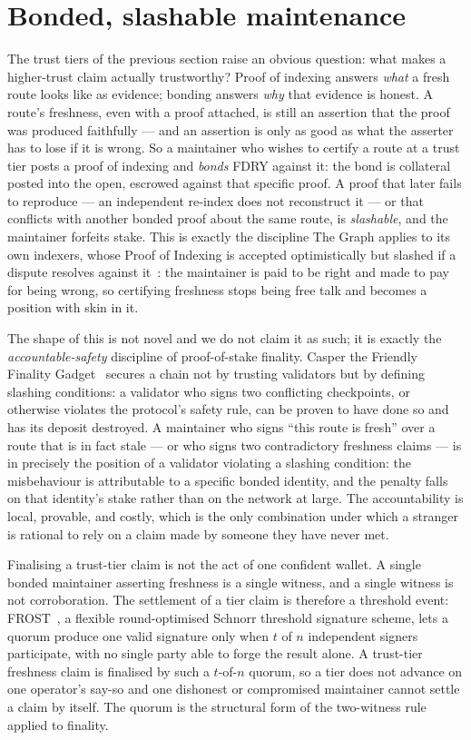 \documentclass[11pt]{article}
\begin{document}
\section{Bonded, slashable maintenance}

The trust tiers of the previous section raise an obvious question: what makes a
higher-trust claim actually trustworthy? Proof of indexing answers \emph{what} a
fresh route looks like as evidence; bonding answers \emph{why} that evidence is
honest. A route's freshness, even with a proof attached, is still an assertion that
the proof was produced faithfully --- and an assertion is only as good as what the
asserter has to lose if it is wrong. So a maintainer who wishes to certify a route
at a trust tier posts a proof of indexing and \emph{bonds} FDRY against it: the bond
is collateral posted into the open, escrowed against that specific proof. A proof
that later fails to reproduce --- an independent re-index does not reconstruct it
--- or that conflicts with another bonded proof about the same route, is
\emph{slashable}, and the maintainer forfeits stake. This is exactly the discipline
The Graph applies to its own indexers, whose Proof of Indexing is accepted
optimistically but slashed if a dispute resolves against it~\cite{thegraph}: the
maintainer is paid to be right and made to pay for being wrong, so certifying
freshness stops being free talk and becomes a position with skin in it.

The shape of this is not novel and we do not claim it as such; it is exactly the
\emph{accountable-safety} discipline of proof-of-stake finality. Casper the
Friendly Finality Gadget~\cite{casper} secures a chain not by trusting validators
but by defining slashing conditions: a validator who signs two conflicting
checkpoints, or otherwise violates the protocol's safety rule, can be proven to
have done so and has its deposit destroyed. A maintainer who signs ``this route is
fresh'' over a route that is in fact stale --- or who signs two contradictory
freshness claims --- is in precisely the position of a validator violating a
slashing condition: the misbehaviour is attributable to a specific bonded
identity, and the penalty falls on that identity's stake rather than on the
network at large. The accountability is local, provable, and costly, which is the
only combination under which a stranger is rational to rely on a claim made by
someone they have never met.

Finalising a trust-tier claim is not the act of one confident wallet. A single
bonded maintainer asserting freshness is a single witness, and a single witness is
not corroboration. The settlement of a tier claim is therefore a threshold event:
FROST~\cite{frost}, a flexible round-optimised Schnorr threshold signature scheme,
lets a quorum produce one valid signature only when $t$ of $n$ independent
signers participate, with no single party able to forge the result alone. A
trust-tier freshness claim is finalised by such a $t$-of-$n$ quorum, so a tier
does not advance on one operator's say-so and one dishonest or compromised
maintainer cannot settle a claim by itself. The quorum is the structural form of
the two-witness rule applied to finality.
\end{document}
